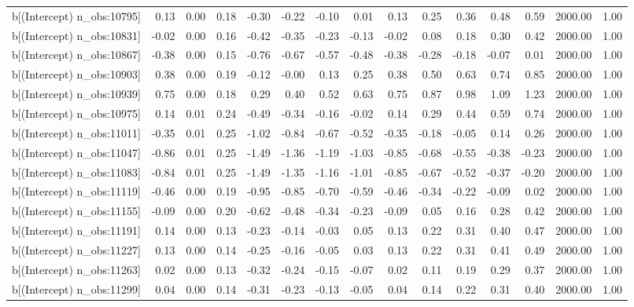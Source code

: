 \begin{table}[ht]
\begin{tabular}{rrrrrrrrrrrrrrr}
  b[(Intercept) n\_obs:10795] & 0.13 & 0.00 & 0.18 & -0.30 & -0.22 & -0.10 & 0.01 & 0.13 & 0.25 & 0.36 & 0.48 & 0.59 & 2000.00 & 1.00 \\ 
  b[(Intercept) n\_obs:10831] & -0.02 & 0.00 & 0.16 & -0.42 & -0.35 & -0.23 & -0.13 & -0.02 & 0.08 & 0.18 & 0.30 & 0.42 & 2000.00 & 1.00 \\ 
  b[(Intercept) n\_obs:10867] & -0.38 & 0.00 & 0.15 & -0.76 & -0.67 & -0.57 & -0.48 & -0.38 & -0.28 & -0.18 & -0.07 & 0.01 & 2000.00 & 1.00 \\ 
  b[(Intercept) n\_obs:10903] & 0.38 & 0.00 & 0.19 & -0.12 & -0.00 & 0.13 & 0.25 & 0.38 & 0.50 & 0.63 & 0.74 & 0.85 & 2000.00 & 1.00 \\ 
  b[(Intercept) n\_obs:10939] & 0.75 & 0.00 & 0.18 & 0.29 & 0.40 & 0.52 & 0.63 & 0.75 & 0.87 & 0.98 & 1.09 & 1.23 & 2000.00 & 1.00 \\ 
  b[(Intercept) n\_obs:10975] & 0.14 & 0.01 & 0.24 & -0.49 & -0.34 & -0.16 & -0.02 & 0.14 & 0.29 & 0.44 & 0.59 & 0.74 & 2000.00 & 1.00 \\ 
  b[(Intercept) n\_obs:11011] & -0.35 & 0.01 & 0.25 & -1.02 & -0.84 & -0.67 & -0.52 & -0.35 & -0.18 & -0.05 & 0.14 & 0.26 & 2000.00 & 1.00 \\ 
  b[(Intercept) n\_obs:11047] & -0.86 & 0.01 & 0.25 & -1.49 & -1.36 & -1.19 & -1.03 & -0.85 & -0.68 & -0.55 & -0.38 & -0.23 & 2000.00 & 1.00 \\ 
  b[(Intercept) n\_obs:11083] & -0.84 & 0.01 & 0.25 & -1.49 & -1.35 & -1.16 & -1.01 & -0.85 & -0.67 & -0.52 & -0.37 & -0.20 & 2000.00 & 1.00 \\ 
  b[(Intercept) n\_obs:11119] & -0.46 & 0.00 & 0.19 & -0.95 & -0.85 & -0.70 & -0.59 & -0.46 & -0.34 & -0.22 & -0.09 & 0.02 & 2000.00 & 1.00 \\ 
  b[(Intercept) n\_obs:11155] & -0.09 & 0.00 & 0.20 & -0.62 & -0.48 & -0.34 & -0.23 & -0.09 & 0.05 & 0.16 & 0.28 & 0.42 & 2000.00 & 1.00 \\ 
  b[(Intercept) n\_obs:11191] & 0.14 & 0.00 & 0.13 & -0.23 & -0.14 & -0.03 & 0.05 & 0.13 & 0.22 & 0.31 & 0.40 & 0.47 & 2000.00 & 1.00 \\ 
  b[(Intercept) n\_obs:11227] & 0.13 & 0.00 & 0.14 & -0.25 & -0.16 & -0.05 & 0.03 & 0.13 & 0.22 & 0.31 & 0.41 & 0.49 & 2000.00 & 1.00 \\ 
  b[(Intercept) n\_obs:11263] & 0.02 & 0.00 & 0.13 & -0.32 & -0.24 & -0.15 & -0.07 & 0.02 & 0.11 & 0.19 & 0.29 & 0.37 & 2000.00 & 1.00 \\ 
  b[(Intercept) n\_obs:11299] & 0.04 & 0.00 & 0.14 & -0.31 & -0.23 & -0.13 & -0.05 & 0.04 & 0.14 & 0.22 & 0.31 & 0.40 & 2000.00 & 1.00 \\ 

\end{tabular}
\end{table}
